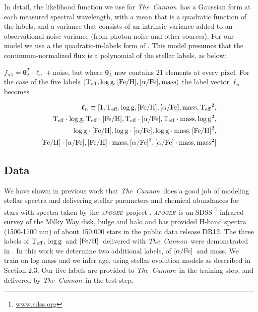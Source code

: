 \documentclass[12pt, preprint]{aastex}
\newcommand{\project}[1]{\textsl{#1}}
\newcommand{\tc}{\project{The~Cannon}}
\newcommand{\apogee}{\project{\textsc{apogee}}}
\newcommand{\teff}{\mbox{$\rm T_{eff}$}}
\newcommand{\feh}{\mbox{$\rm [Fe/H]$}}
\newcommand{\alphafe}{\mbox{$\rm [\alpha/Fe]$}}
\newcommand{\logg}{\mbox{$\rm \log g$}}
\newcommand{\set}[1]{\bm{#1}}
\newcommand{\starlabel}{\ell}
\newcommand{\starlabelvec}{\set{\starlabel}}
\begin{document}
In detail, the likelihood function we use for \tc\ has a
Gaussian form at each measured spectral wavelength, with a mean that
is a quadratic function of the labels, and a variance that consists of
an intrinsic variance added to an observational noise variance (from
photon noise and other sources). For our model we use a the quadratic-in-labels form of \citet{Ness2015}. This model presumes that the continuum-normalized flux is a polynomial of the stellar labels, as below: 

$f_{n\lambda} =
\set{\theta}_\lambda^T \cdot \starlabelvec_n + \mbox{noise}$, 
but where $\set{\theta}_\lambda$ now contains 21 elements at every pixel. For the case of the five labels $(\teff , \logg , \feh, \alphafe, \mbox{mass})$ the label vector $\starlabelvec_n$
becomes  

\begin{equation}
\begin{split}
\starlabelvec_n \equiv  [1, \teff, \logg, \feh, \alphafe, \mbox{mass}, \teff^2, \\
 \teff\cdot\logg, \teff\cdot\feh, \teff\cdot\alphafe, \teff\cdot \mbox{mass},  \logg^2, \\
  \logg\cdot\feh, \logg\cdot\alphafe, \logg\cdot \mbox{mass}, \feh^2, \\
  \feh\cdot\alphafe, \feh\cdot \mbox{mass}, \alphafe^2, \alphafe\cdot \mbox{mass}, \mbox{mass}^2]
\end{split}
 \label{eq:quad}
\end{equation}


\subsection{Data}

We have shown in previous work \citep{Ness2015} that \tc\ does a good job
of modeling stellar spectra and delivering stellar parameters and
chemical abundances for stars with spectra taken by the \apogee\ project \citep{Majewski2012}.  \apogee\ is an SDSS \footnote{\url{www.sdss.org}}  \citep{E2011} infrared survey of the Milky Way disk, bulge and halo and has provided H-band spectra (1500-1700 nm) of about 150,000 stars in the public data release DR12.  
The three labels of \teff, \logg\ and \feh\ delivered with \tc\ were demonstrated in \citet{Ness2015}.  In this work we determine two additional labels, of \alphafe\ and mass. We train on log mass and we infer age, using stellar evolution models as described in Section 2.3. Our five labels are provided to \tc\ in the training step, and delivered by \tc\ in the test step.
\end{document}
